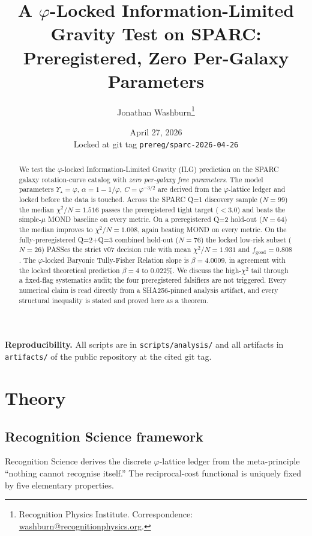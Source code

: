 \documentclass[11pt,a4paper]{article}
\title{A $\varphi$-Locked Information-Limited Gravity Test on SPARC:\\Preregistered, Zero Per-Galaxy Parameters}
\author{Jonathan Washburn\thanks{Recognition Physics Institute. Correspondence: \href{mailto:washburn@recognitionphysics.org}{washburn@recognitionphysics.org}.}}
\date{April 27, 2026 \\ \small Locked at git tag \texttt{prereg/sparc-2026-04-26}}
\newcommand{\Ystar}{\ensuremath{\Upsilon_{\star}}}
\newcommand{\chiN}{\ensuremath{\chi^{2}/N}}
\theoremstyle{plain}
\theoremstyle{definition}
\begin{document}
\maketitle

\begin{abstract}
We test the $\varphi$-locked Information-Limited Gravity (ILG) prediction on the SPARC galaxy rotation-curve catalog with \emph{zero per-galaxy free parameters}. The model parameters $\Ystar = \varphi$, $\alpha = 1 - 1/\varphi$, $C = \varphi^{-3/2}$ are derived from the $\varphi$-lattice ledger and locked before the data is touched. Across the SPARC Q=1 discovery sample ($N=99$) the median $\chiN = 1.516$ passes the preregistered tight target ($<3.0$) and beats the simple-$\mu$ MOND baseline on every metric. On a preregistered Q=2 hold-out ($N=64$) the median improves to $\chiN = 1.008$, again beating MOND on every metric. On the fully-preregistered Q=2+Q=3 combined hold-out ($N=76$) the locked low-risk subset ($N=26$) PASSes the strict v07 decision rule with mean $\chiN = 1.931$ and $f_{\mathrm{good}} = 0.808$. The $\varphi$-locked Baryonic Tully-Fisher Relation slope is $\beta = 4.0009$, in agreement with the locked theoretical prediction $\beta = 4$ to $0.022\%$. We discuss the high-$\chi^2$ tail through a fixed-flag systematics audit; the four preregistered falsifiers are not triggered. Every numerical claim is read directly from a SHA256-pinned analysis artifact, and every structural inequality is stated and proved here as a theorem.
\end{abstract}

\noindent\textbf{Reproducibility.} All scripts are in \texttt{scripts/analysis/} and all artifacts in \texttt{artifacts/} of the public repository at the cited git tag.

\section{Theory}

\subsection{Recognition Science framework}
Recognition Science derives the discrete $\varphi$-lattice ledger from the meta-principle ``nothing cannot recognise itself.'' The reciprocal-cost functional is uniquely fixed by five elementary properties.
\end{document}

